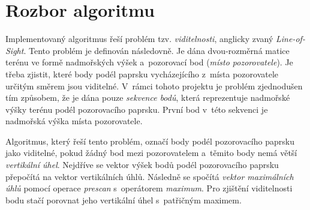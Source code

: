 \documentclass[a4paper, 10pt, twocolumn]{article}
\begin{document}


    \section{Rozbor algoritmu}

    Implementovaný algoritmus řeší problém tzv. \emph{viditelnosti},
    anglicky zvaný \emph{Line-of-Sight}. Tento problém je definován
    následovně. Je dána dvou-rozměrná matice terénu ve formě nadmořských
    výšek a~pozorovací bod (\emph{místo pozorovatele}). Je třeba zjistit,
    které body podél paprsku vycházejícího z~místa pozorovatele určitým
    směrem jsou viditelné. V~rámci tohoto projektu je problém zjednodušen
    tím způsobem, že je dána pouze \emph{sekvence bodů}, která reprezentuje
    nadmořské výšky terénu podél pozorovacího paprsku. První bod v~této
    sekvenci je nadmořská výška místa pozorovatele.

    Algoritmus, který řeší tento problém, označí body podél pozorovacího
    paprsku jako viditelné, pokud žádný bod mezi pozorovatelem a~těmito
    body nemá větší \emph{vertikální úhel}. Nejdříve se vektor výšek
    bodů podél pozorovacího paprsku přepočítá na vektor vertikálních
    úhlů. Následně se spočítá \emph{vektor maximálních úhlů} pomocí
    operace \emph{prescan} s~operátorem \emph{maximum}. Pro zjištění
    viditelnosti bodu stačí porovnat jeho vertikální úhel s~patřičným
    maximem.
\end{document}
